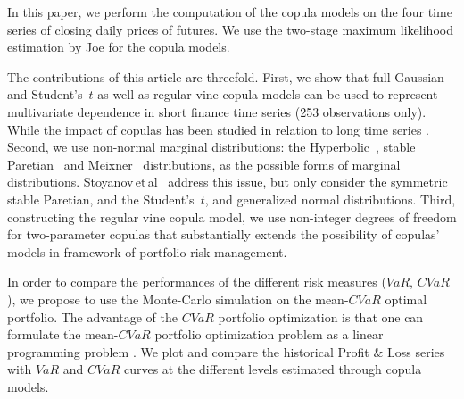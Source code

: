 \documentclass{llncs}
\begin{document}
In this paper, we perform the computation of the copula models on the four time series of closing daily prices of futures. We use the two-stage maximum likelihood estimation by Joe \cite{Joe1997,Joe2014} for the copula models.

The contributions of this article are threefold. First, we show that full Gaussian and Student’s~$t$ as well as regular vine copula models can be used to represent multivariate dependence in short finance time series (253 observations only).  While the impact of copulas has been studied in relation to long time series \cite{Kole2007, Lourme2016, Dissmann2013}. Second, we use non-normal marginal distributions: the Hyperbolic~\cite{Barndoff1983}, stable Paretian~\cite{Rachev2005} and Meixner~\cite{Schoutens2002} distributions, as the possible forms of marginal distributions. Stoyanov\,et\,al~\cite{Stoyanov2013} address this issue, but only consider the symmetric stable Paretian, and the Student's~$t$, and generalized normal distributions. Third, constructing the regular vine copula model, we use %
non-integer degrees of freedom for two-parameter copulas that substantially extends the possibility of copulas' models in framework of portfolio risk management. %



%
%
In order to compare the performances of the different risk measures  ($VaR$, $CVaR$), we  propose to use the Monte-Carlo simulation on the mean-$CVaR$ optimal portfolio. 
%
The advantage of the $CVaR$ portfolio optimization is that one can formulate the mean-$CVaR$ portfolio optimization problem as a linear programming problem \cite{Rock2000}.
We plot and compare the historical Profit \& Loss series with $VaR$ and $CVaR$ curves at the different levels estimated through copula models.

\end{document}
